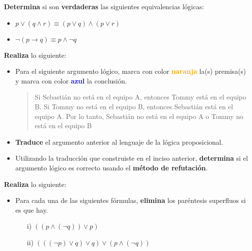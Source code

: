 \documentclass[oneside]{style}
\begin{document}
\begin{questions}[label=\protect\circled{\bfseries\arabic*}]
    \question
    {
        \textbf{Determina} si son \textbf{verdaderas} las siguientes 
        equivalencias lógicas:
        \begin{itemize}
            \item $p \lor (q \land r) \equiv (p \lor q) \land (p \lor r)$

            \item $\neg (p \rightarrow q) \equiv p \land \neg q$
        \end{itemize}
    }

    \question
    {
        \textbf{Realiza} lo siguiente:
        \begin{itemize}
            \item Para el siguiente argumento lógico, marca con color 
            \textcolor{orange}{\textbf{naranja}} la(s) premisa(s) y marca con 
            color \textcolor{blue}{\textbf{azul}} la conclusión.

            \begin{quote}
                \centering
                Si Sebastián no está en el equipo A, entonces Tommy está en el 
                equipo B. Si Tommy no está en el equipo B, entonces Sebastián 
                está en el equipo A. Por lo tanto, Sebastián no está en el 
                equipo A o Tommy no está en el equipo B
            \end{quote}
    
            \item \textbf{Traduce} el argumento anterior al lenguaje de la lógica 
            proposicional.
    
            \item Utilizando la traducción que construiste en el inciso anterior, 
            \textbf{determina} si el argumento lógico es correcto usando el 
            \textbf{método de refutación}.
        \end{itemize}
    }

    \question
    {
        \textbf{Realiza} lo siguiente:
        \begin{itemize}
            \item Para cada una de las siguientes fórmulas, \textbf{elimina} 
            los paréntesis superfluos si es que hay.
            \begin{itemize}
                \item[i)] $((p \land (\neg q)) \lor p)$
                \item[ii)] $(((\neg p) \lor q) \lor q) \lor (p \land (\neg q))$
            \end{itemize}
            

\end{itemize}}
\end{questions}
\end{document}
